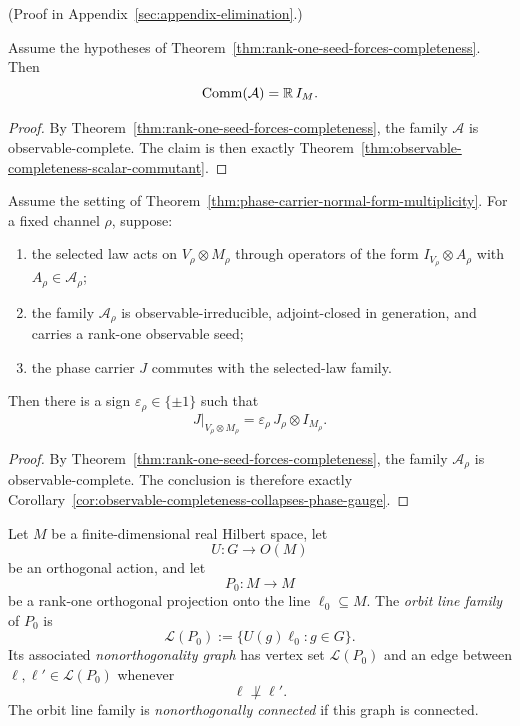 (Proof in Appendix~\ref{sec:appendix-elimination}.)

\begin{corollary}
\label{cor:rank-one-seed-scalar-commutant}
Assume the hypotheses of
Theorem~\ref{thm:rank-one-seed-forces-completeness}. Then
\[
\mathrm{Comm}(\mathcal A)=\mathbb{R}\,I_M.
\]
\end{corollary}

\begin{proof}
By Theorem~\ref{thm:rank-one-seed-forces-completeness}, the family
$\mathcal A$ is observable-complete. The claim is then exactly
Theorem~\ref{thm:observable-completeness-scalar-commutant}.
\end{proof}

\begin{corollary}
\label{cor:rank-one-seed-phase}
Assume the setting of
Theorem~\ref{thm:phase-carrier-normal-form-multiplicity}. For a fixed channel
$\rho$, suppose:
\begin{enumerate}[label=(\roman*), leftmargin=2em, itemsep=0.2em]
\item the selected law acts on $V_{\rho}\otimes M_{\rho}$ through operators of
      the form $I_{V_{\rho}}\otimes A_{\rho}$ with
      $A_{\rho}\in\mathcal A_{\rho}$;
\item the family $\mathcal A_{\rho}$ is observable-irreducible, adjoint-closed
      in generation, and carries a rank-one observable seed;
\item the phase carrier $J$ commutes with the selected-law family.
\end{enumerate}
Then there is a sign $\varepsilon_{\rho}\in\{\pm1\}$ such that
\[
J|_{V_{\rho}\otimes M_{\rho}}
=
\varepsilon_{\rho}\,J_{\rho}\otimes I_{M_{\rho}}.
\]
\end{corollary}

\begin{proof}
By Theorem~\ref{thm:rank-one-seed-forces-completeness}, the family
$\mathcal A_{\rho}$ is observable-complete. The conclusion is therefore
exactly Corollary~\ref{cor:observable-completeness-collapses-phase-gauge}.
\end{proof}

\begin{definition}
\label{def:observable-orbit-line-family}
Let $M$ be a finite-dimensional real Hilbert space, let
\[
U:G\to O(M)
\]
be an orthogonal action, and let
\[
P_0:M\to M
\]
be a rank-one orthogonal projection onto the line $\ell_0\subseteq M$. The
\emph{orbit line family} of $P_0$ is
\[
\mathcal L(P_0):=\{U(g)\ell_0 : g\in G\}.
\]
Its associated \emph{nonorthogonality graph} has vertex set
$\mathcal L(P_0)$ and an edge between $\ell,\ell'\in\mathcal L(P_0)$ whenever
\[
\ell\not\perp \ell'.
\]
The orbit line family is \emph{nonorthogonally connected} if this graph is
connected.
\end{definition}

